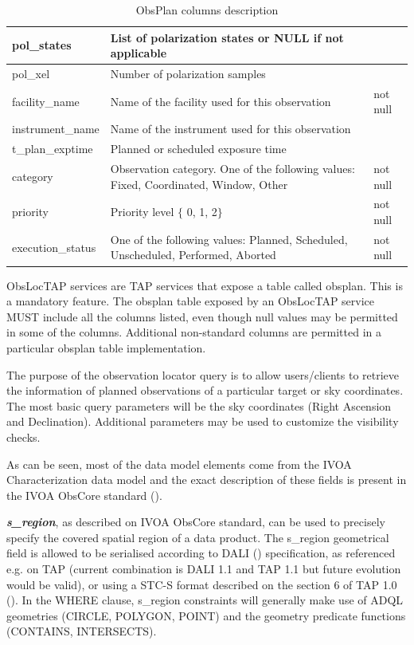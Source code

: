 \documentclass[11pt,a4paper]{ivoa}
\begin{document}
\begin{landscape}
\begin{table}
\begin{tabular}{ |l|l|l| }
\hline
pol\_states &
List of polarization states or NULL if not applicable &
\\
\hline
pol\_xel &
Number of polarization samples &
\\
\hline
facility\_name &
Name of the facility used for this observation &
not null\\
\hline
instrument\_name &
Name of the instrument used for this observation &
\\
\hline
t\_plan\_exptime &
Planned or scheduled exposure time &
\\
\hline
category &
Observation category. One of the following values: Fixed, Coordinated, Window, 
Other &
not null\\
\hline
priority &
Priority level $ \{ $ 0, 1, 2$ \} $ &
not null\\
\hline
execution\_status &
One of the following values:  Planned, Scheduled, Unscheduled, Performed, Aborted &
not null\\
\hline
\end{tabular}
\caption{ObsPlan columns description}
\label{tab:obsplancolumns}
\end{table}
\end{landscape}

ObsLocTAP services are TAP services that expose a table called obsplan. This
is a mandatory feature. The obsplan table exposed by an ObsLocTAP service MUST
include all  the columns listed, even though null values may be permitted in
some of the columns. Additional non-standard columns are permitted in a 
particular obsplan table implementation.

The purpose of the observation locator query is to allow users/clients to
retrieve the information of planned observations of a particular target or
sky coordinates. The most basic query parameters will be the sky coordinates
(Right Ascension and Declination). Additional parameters may be used to
customize the visibility checks.

As can be seen, most of the data model elements come from the IVOA
Characterization data model and the exact description of these fields is
present in the IVOA ObsCore standard (\citealt{2017ivoa.spec.0509L}).

\textbf{\textit{s\_region}}, as described on IVOA ObsCore standard, can be
used to precisely specify the covered spatial region of a data product. The
s\_region geometrical field is allowed to be serialised according to DALI
(\citealt{std:DALI11}) specification, as referenced e.g. on TAP (current combination is DALI 1.1 and TAP 1.1 but future evolution would be valid), 
or using a STC-S format described on the section 6 of TAP 1.0 
(\citealt{2011ivoa.spec.1028T}). In the WHERE clause, s\_region constraints will generally make use of ADQL geometries (CIRCLE, POLYGON, POINT) and the geometry predicate functions (CONTAINS, INTERSECTS).
\end{document}
